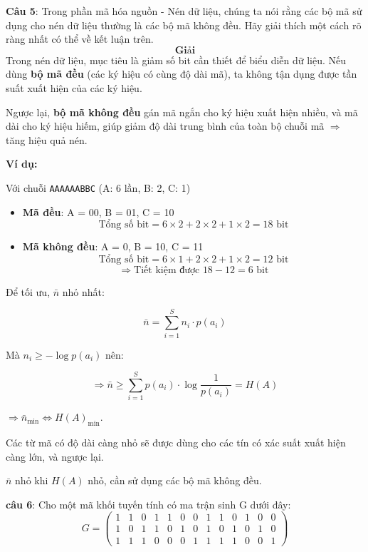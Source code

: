 \documentclass[12pt]{article}
\begin{document}

\newpage
\textbf{Câu 5}: Trong phần mã hóa nguồn - Nén dữ liệu, chúng ta nói rằng các bộ mã sử dụng cho nén dữ liệu thường là các bộ mã không đều. Hãy giải thích một cách rõ ràng nhất có thể về kết luận trên.
\[
\textbf{Giải}
\]
Trong nén dữ liệu, mục tiêu là giảm số bit cần thiết để biểu diễn dữ liệu. Nếu dùng \textbf{bộ mã đều} (các ký hiệu có cùng độ dài mã), ta không tận dụng được tần suất xuất hiện của các ký hiệu.

Ngược lại, \textbf{bộ mã không đều} gán mã ngắn cho ký hiệu xuất hiện nhiều, và mã dài cho ký hiệu hiếm, giúp giảm độ dài trung bình của toàn bộ chuỗi mã $\Rightarrow$ tăng hiệu quả nén.

\textbf{Ví dụ:}

Với chuỗi \texttt{AAAAAABBC} (A: 6 lần, B: 2, C: 1)

\begin{itemize}
    \item \textbf{Mã đều}: A = 00, B = 01, C = 10
    \[
    \text{Tổng số bit} = 6 \times 2 + 2 \times 2 + 1 \times 2 = 18 \text{ bit}
    \]
    
    \item \textbf{Mã không đều}: A = 0, B = 10, C = 11
    \[
    \text{Tổng số bit} = 6 \times 1 + 2 \times 2 + 1 \times 2 = 12 \text{ bit}
    \]
    \[
    \Rightarrow \text{Tiết kiệm được } 18 - 12 = 6 \text{ bit}
    \]
\end{itemize}

Để tối ưu, $\bar{n}$ nhỏ nhất:

\[
\bar{n} = \sum_{i=1}^{S} n_i \cdot p(a_i)
\]

Mà $n_i \geq -\log p(a_i)$ nên:

\[
\Rightarrow\bar{n} \geq \sum_{i=1}^{S} p(a_i) \cdot \log \frac{1}{p(a_i)} = H(A)
\]

$\Rightarrow \bar{n}_{\min} \Leftrightarrow H(A)_{\min}$.

Các từ mã có độ dài càng nhỏ sẽ được dùng cho các tín có xác suất xuất hiện càng lớn, và ngược lại.

$\bar{n}$ nhỏ khi $H(A)$ nhỏ, cần sử dụng các bộ mã không đều.

\newpage
\textbf{câu 6}: Cho một mã khối tuyến tính có ma trận sinh G dưới đây:
\[
G = \left(
\begin{array}{ccccccccccccc}
1 & 1 & 0 & 1 & 1 & 0 & 0 & 1 & 1 & 0 & 1 & 0 & 0 \\
1 & 0 & 1 & 1 & 0 & 1 & 0 & 1 & 0 & 1 & 0 & 1 & 0 \\
1 & 1 & 1 & 0 & 0 & 0 & 1 & 1 & 1 & 1 & 0 & 0 & 1
\end{array}
\right)
\]
\end{document}
